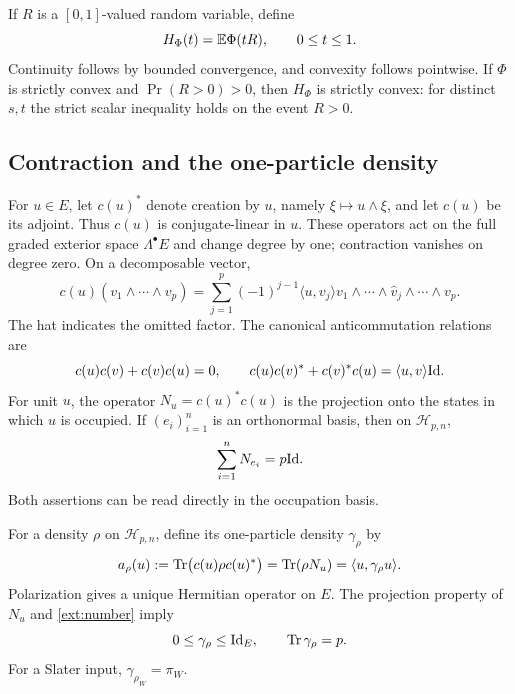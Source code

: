 If $R$ is a $[0,1]$-valued random variable, define
\begin{equation}
 H_\Phi(t)=\mathbb E\Phi(tR),\qquad 0\le t\le1.
 \label{ext:scale-function}
\end{equation}
Continuity follows by bounded convergence, and convexity follows
pointwise. If $\Phi$ is strictly convex and $\Pr(R>0)>0$, then
$H_\Phi$ is strictly convex: for distinct $s,t$ the strict scalar
inequality holds on the event $R>0$.

\subsection{Contraction and the one-particle density}

For $u\in E$, let $c(u)^*$ denote creation by $u$, namely
$\xi\mapsto u\wedge\xi$, and let $c(u)$ be its adjoint. Thus $c(u)$
is conjugate-linear in $u$. These operators act on the full graded
exterior space $\Lambda^\bullet E$ and change degree by one; contraction
vanishes on degree zero. On a decomposable vector,
\begin{equation}
 c(u)(v_1\wedge\cdots\wedge v_p)
 =\sum_{j=1}^p(-1)^{j-1}\langle u,v_j\rangle
 v_1\wedge\cdots\wedge\widehat v_j\wedge\cdots\wedge v_p.
 \label{ext:contraction}
\end{equation}
The hat indicates the omitted factor. The canonical anticommutation
relations are
\[
 c(u)c(v)+c(v)c(u)=0,
 \qquad
 c(u)c(v)^*+c(v)^*c(u)=\langle u,v\rangle\mathrm{Id}.
\]
For unit $u$, the operator $N_u=c(u)^*c(u)$ is the projection onto
the states in which $u$ is occupied. If $(e_i)_{i=1}^n$ is an
orthonormal basis, then on $\mathcal H_{p,n}$,
\begin{equation}
 \sum_{i=1}^n N_{e_i}=p\mathrm{Id}.
 \label{ext:number}
\end{equation}
Both assertions can be read directly in the occupation basis.

For a density $\rho$ on $\mathcal H_{p,n}$, define its one-particle
density $\gamma_\rho$ by
\begin{equation}
 a_\rho(u):=\operatorname{Tr}\bigl(c(u)\rho c(u)^*\bigr)
 =\operatorname{Tr}(\rho N_u)=\langle u,\gamma_\rho u\rangle.
 \label{ext:one-body}
\end{equation}
Polarization gives a unique Hermitian operator on $E$. The projection
property of $N_u$ and \eqref{ext:number} imply
\begin{equation}
 0\le\gamma_\rho\le\mathrm{Id}_E,
 \qquad \operatorname{Tr}\gamma_\rho=p.
 \label{ext:pauli-bounds}
\end{equation}
For a Slater input, $\gamma_{\rho_W}=\pi_W$.

